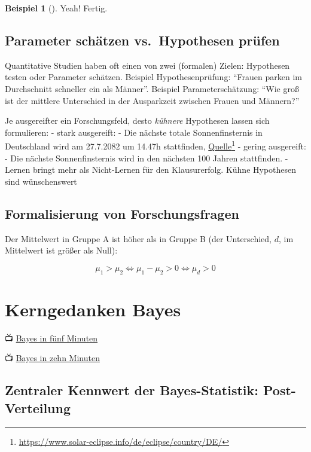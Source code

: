 \documentclass[
  ngerman,
  letterpaper,
  twoside,
  open=any]{scrbook}
\theoremstyle{definition}
\newtheorem{example}{Beispiel}[chapter]
\theoremstyle{plain}
\theoremstyle{definition}
\theoremstyle{definition}
\theoremstyle{remark}
\begin{document}
\begin{example}[]
Yeah! Fertig.

\subsection{Parameter schätzen vs.~Hypothesen
prüfen}\label{parameter-schuxe4tzen-vs.-hypothesen-pruxfcfen}

Quantitative Studien haben oft einen von zwei (formalen) Zielen:
Hypothesen testen oder Parameter schätzen. Beispiel Hypothesenprüfung:
\enquote{Frauen parken im Durchschnitt schneller ein als Männer}.
Beispiel Parameterschätzung: \enquote{Wie groß ist der mittlere
Unterschied in der Ausparkzeit zwischen Frauen und Männern?}

Je ausgereifter ein Forschungsfeld, desto \emph{kühnere} Hypothesen
lassen sich formulieren: - stark ausgereift: - Die nächste totale
Sonnenfinsternis in Deutschland wird am 27.7.2082 um 14.47h stattfinden,
\href{https://www.solar-eclipse.info/de/eclipse/country/DE/}{Quelle}\footnote{\url{https://www.solar-eclipse.info/de/eclipse/country/DE/}}
- gering ausgereift: - Die nächste Sonnenfinsternis wird in den nächsten
100 Jahren stattfinden. - Lernen bringt mehr als Nicht-Lernen für den
Klausurerfolg. Kühne Hypothesen sind wünschenswert 🦹

\subsection{Formalisierung von
Forschungsfragen}\label{formalisierung-von-forschungsfragen}

Der Mittelwert in Gruppe A ist höher als in Gruppe B (der Unterschied,
\(d\), im Mittelwert ist größer als Null):

\[\mu_1 > \mu_2 \Leftrightarrow \mu_1 - \mu_2 > 0 \Leftrightarrow \mu_d > 0\]

\section{Kerngedanken Bayes}\label{kerngedanken-bayes}

📺 \href{https://www.youtube.com/watch?v=yfOppH_2uSI}{Bayes in fünf
Minuten}

📺 \href{https://www.youtube.com/watch?v=8a75ZnyycFc}{Bayes in zehn
Minuten}

\subsection{Zentraler Kennwert der Bayes-Statistik:
Post-Verteilung}\label{zentraler-kennwert-der-bayes-statistik-post-verteilung}


\end{example}
\end{document}
